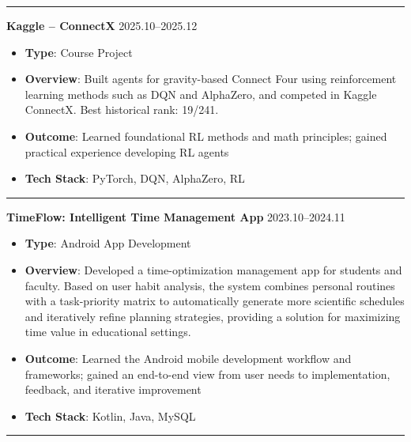 \documentclass[11pt]{article}
\begin{document}
\par\noindent\textcolor{black!20}{\rule{\linewidth}{0.5pt}}

\vspace*{0.1em}

\textbf{\large \color{CVBlue} Kaggle -- ConnectX} \hfill 2025.10--2025.12
\begin{itemize}
    \item \textbf{Type}: Course Project

    \item \textbf{Overview}: Built agents for gravity-based Connect Four using reinforcement learning methods such as DQN and AlphaZero, and competed in Kaggle ConnectX.
    Best historical rank: 19/241.
    \item[\textcolor{CVBlue}{\faStar}] \textbf{\textcolor{CVBlue}{Outcome}}: Learned foundational RL methods and math principles; gained practical experience developing RL agents
    \item \textbf{Tech Stack}: PyTorch, DQN, AlphaZero, RL
\end{itemize}

\par\noindent\textcolor{black!20}{\rule{\linewidth}{0.5pt}}

\vspace*{0.1em}

\textbf{\large \color{CVBlue} TimeFlow: Intelligent Time Management App} \hfill 2023.10--2024.11
\begin{itemize}
    \item \textbf{Type}: Android App Development

    \item \textbf{Overview}: Developed a time-optimization management app for students and faculty.
    Based on user habit analysis, the system combines personal routines with a task-priority matrix to automatically generate more scientific schedules and iteratively refine planning strategies, providing a solution for maximizing time value in educational settings.
    \item[\textcolor{CVBlue}{\faStar}] \textbf{\textcolor{CVBlue}{Outcome}}: Learned the Android mobile development workflow and frameworks; gained an end-to-end view from user needs to implementation, feedback, and iterative improvement
    \item \textbf{Tech Stack}: Kotlin, Java, MySQL
\end{itemize}

\par\noindent\textcolor{black!20}{\rule{\linewidth}{0.5pt}}
\end{document}
